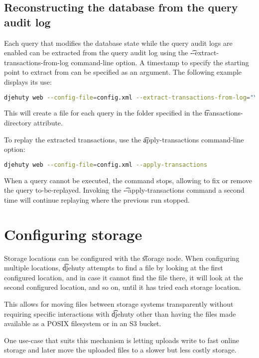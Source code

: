 \subsection{Reconstructing the database from the query audit log}

  Each query that modifies the database state while the query audit logs
  are enabled can be extracted from the query audit log using the
  \t{-{}-extract-transactions-from-log} command-line option.  A timestamp to
  specify the starting point to extract from can be specified as an argument.
  The following example displays its use:

\begin{lstlisting}[language=bash]
djehuty web --config-file=config.xml --extract-transactions-from-log="YYYY-MM-DD HH:MM:SS"
\end{lstlisting}

This will create a file for each query in the folder specified in the
\t{transactions-directory} attribute.

  To replay the extracted transactions, use the \t{apply-transactions}
  command-line option:
\begin{lstlisting}[language=bash]
djehuty web --config-file=config.xml --apply-transactions
\end{lstlisting}

  When a query cannot be executed, the command stops, allowing to fix or
  remove the query to-be-replayed.  Invoking the \t{-{}-apply-transactions}
  command a second time will continue replaying where the previous run stopped.

\section{Configuring storage}

  Storage locations can be configured with the \t{storage} node.
  When configuring multiple locations, \t{djehuty} attempts to find a
  file by looking at the first configured location, and in case it cannot
  find the file there, it will look at the second configured location,
  and so on, until it has tried each storage location.

  This allows for moving files between storage systems transparently
  without requiring specific interactions with \t{djehuty} other than
  having the files made available as a POSIX filesystem or in an S3 bucket.

  One use-case that suits this mechanism is letting uploads write to
  fast online storage and later move the uploaded files to a slower but
  less costly storage.

